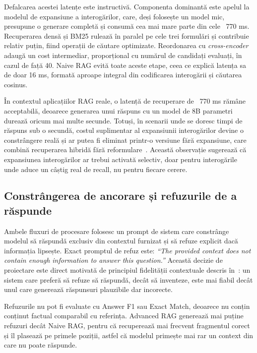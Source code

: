 Defalcarea acestei latențe este instructivă. Componenta dominantă este apelul la modelul de expansiune a interogărilor, care, deși folosește un model mic, presupune o generare completă și consumă cea mai mare parte din cele ~770 ms. Recuperarea densă și BM25 rulează în paralel pe cele trei formulări și contribuie relativ puțin, fiind operații de căutare optimizate. Reordonarea cu \textit{cross-encoder} adaugă un cost intermediar, proporțional cu numărul de candidați evaluați, în cazul de față 40. Naive RAG evită toate aceste etape, ceea ce explică latența sa de doar 16 ms, formată aproape integral din codificarea interogării și căutarea cosinus.

În contextul aplicațiilor RAG reale, o latență de recuperare de ~770 ms rămâne acceptabilă, deoarece generarea unui răspuns cu un model de 8B parametri durează oricum mai multe secunde. Totuși, în scenarii unde se doresc timpi de răspuns sub o secundă, costul suplimentar al expansiunii interogărilor devine o constrângere reală și ar putea fi eliminat printr-o versiune fără expansiune, care combină recuperarea hibridă fără reformulare~\cite{gao2024retrievalaugmentedgenerationlargelanguage}. Această observație sugerează că expansiunea interogărilor ar trebui activată selectiv, doar pentru interogările unde aduce un câștig real de recall, nu pentru fiecare cerere.

\subsection{Constrângerea de ancorare și refuzurile de a răspunde}

Ambele fluxuri de procesare folosesc un prompt de sistem care constrânge modelul să răspundă exclusiv din contextul furnizat și să refuze explicit dacă informația lipsește. Exact promptul de refuz este: \textit{``The provided context does not contain enough information to answer this question.''} Această decizie de proiectare este direct motivată de principiul fidelității contextuale descris în~\cite{asai2023self}: un sistem care preferă să refuze să răspundă, decât să inventeze, este mai fiabil decât unul care generează răspunsuri plauzibile dar incorecte.

Refuzurile nu pot fi evaluate cu Answer F1 sau Exact Match, deoarece nu conțin conținut factual comparabil cu referința. Advanced RAG generează mai puține refuzuri decât Naive RAG, pentru că recuperează mai frecvent fragmentul corect și îl plasează pe primele poziții, astfel că modelul primește mai rar un context din care nu poate răspunde.


